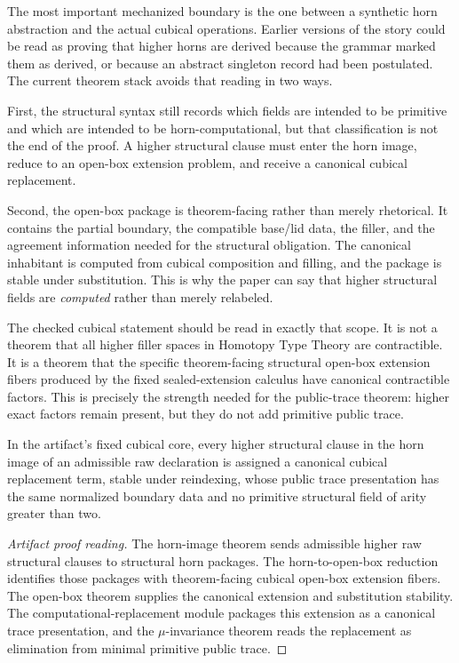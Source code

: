 The most important mechanized boundary is the one between a synthetic horn abstraction and the
actual cubical operations.  Earlier versions of the story could be read as proving that higher
horns are derived because the grammar marked them as derived, or because an abstract singleton
record had been postulated.  The current theorem stack avoids that reading in two ways.

First, the structural syntax still records which fields are intended to be primitive and which
are intended to be horn-computational, but that classification is not the end of the proof.  A
higher structural clause must enter the horn image, reduce to an open-box extension problem,
and receive a canonical cubical replacement.

Second, the open-box package is theorem-facing rather than merely rhetorical.  It contains the
partial boundary, the compatible base/lid data, the filler, and the agreement information needed
for the structural obligation.  The canonical inhabitant is computed from cubical composition
and filling, and the package is stable under substitution.  This is why the paper can say that
higher structural fields are \emph{computed} rather than merely relabeled.

The checked cubical statement should be read in exactly that scope.  It is not a theorem that
all higher filler spaces in Homotopy Type Theory are contractible.  It is a theorem that the
specific theorem-facing structural open-box extension fibers produced by the fixed
sealed-extension calculus have canonical contractible factors.  This is precisely the strength
needed for the public-trace theorem: higher exact factors remain present, but they do not add
primitive public trace.

\begin{theorem}
\label{thm:checked-horn-core-artifact-reading}
In the artifact's fixed cubical core, every higher structural clause in the horn image of an
admissible raw declaration is assigned a canonical cubical replacement term, stable under
reindexing, whose public trace presentation has the same normalized boundary data and no
primitive structural field of arity greater than two.
\end{theorem}

\begin{proof}[Artifact proof reading]
The horn-image theorem sends admissible higher raw structural clauses to structural horn
packages.  The horn-to-open-box reduction identifies those packages with theorem-facing cubical
open-box extension fibers.  The open-box theorem supplies the canonical extension and
substitution stability.  The computational-replacement module packages this extension as a
canonical trace presentation, and the \(\mu\)-invariance theorem reads the replacement as
elimination from minimal primitive public trace.
\end{proof}

